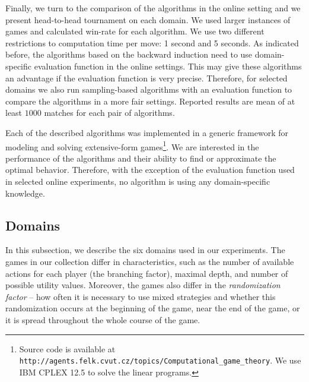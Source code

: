 Finally, we turn to the comparison of the algorithms in the online setting and we present head-to-head tournament on each domain.
We used larger instances of games and calculated win-rate for each algorithm.
We use two different restrictions to computation time per move: 1 second and 5 seconds.
As indicated before, the algorithms based on the backward induction need to use domain-specific evaluation function in the online settings.
This may give these algorithms an advantage if the evaluation function is very precise.
Therefore, for selected domains we also run sampling-based algorithms with an evaluation function to compare the algorithms in a more fair settings.
Reported results are mean of at least $1000$ matches for each pair of algorithms.

Each of the described algorithms was implemented in a generic framework for modeling and solving extensive-form games\footnote{Source code is available at \texttt{http://agents.felk.cvut.cz/topics/Computational\_\newline game\_theory}. We use IBM CPLEX 12.5 to solve the linear programs.}.
We are interested in the performance of the algorithms and their ability to find or approximate the optimal behavior.
Therefore, with the exception of the evaluation function used in selected online experiments, no algorithm is using any domain-specific knowledge.


\subsection{Domains}\label{sec:eval:domains}

In this subsection, we describe the six domains used in our experiments.
The games in our collection differ in characteristics, such as the number of available actions for each player (\ie the branching factor), maximal depth, and number of possible utility values.
Moreover, the games also differ in the \emph{randomization factor} -- \ie how often it is necessary to use mixed strategies and whether this randomization occurs at the beginning of the game, near the end of the game, or it is spread throughout the whole course of the game.

